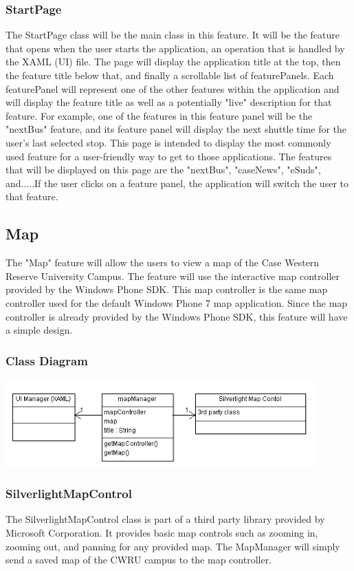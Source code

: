 \documentclass[pdftex,12pt,letter]{article}
\begin{document}
\subsubsection{StartPage}
The StartPage class will be the main class in this feature. It will be the feature that opens when the user starts the application, an operation that is handled by the XAML (UI) file. The page will display the application title at the top, then the feature title below that, and finally a scrollable list of featurePanels. Each featurePanel will represent one of the other features within the application and will display the feature title as well as a potentially "live" description for that feature. For example, one of the features in this feature panel will be the "nextBus" feature, and its feature panel will display the next shuttle time for the user's last selected stop. This page is intended to display the most commonly used feature for a user-friendly way to get to those applications. The features that will be displayed on this page are the "nextBus", "caseNews", "eSuds", and.....If the user clicks on a feature panel, the application will switch the user to that feature.


\subsection{Map}
The "Map" feature will allow the users to view a map of the Case Western Reserve University Campus. The feature will use the interactive map controller provided by the Windows Phone SDK. This map controller is the same map controller used for the default Windows Phone 7 map application. Since the map controller is already provided by the Windows Phone SDK, this feature will have a simple design.
\subsubsection{Class Diagram}
\includegraphics[width=120mm]{MapCD.png}
\subsubsection{SilverlightMapControl}
The SilverlightMapControl class is part of a third party library provided by Microsoft Corporation. It provides basic map controls such as zooming in, zooming out, and panning for any provided map. The MapManager will simply send a saved map of the CWRU campus to the map controller.
\end{document}
